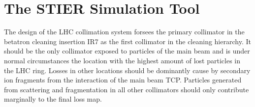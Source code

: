 



\section{The STIER Simulation Tool}

 The design of the LHC collimation system forsees the primary collimator in the betatron cleaning insertion IR7 as the first collimator in the cleaning hierarchy. It should be the only collimator exposed to particles of the main beam and is under normal circumstances the location with the highest amount of lost particles in the LHC ring. Losses in other locations should be dominantly cause by secondary ion fragments from the interaction of the main beam TCP. Particles generated from scattering and fragmentation in all other collimators should only contribute marginally to the final loss map. 

